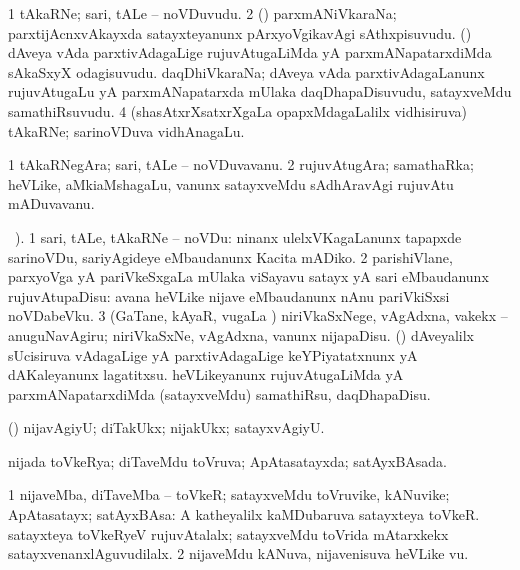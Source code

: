 \bentry
{} 
\gl{\nA}
\expl{}
\bmng
\bnum
\num{1} tAkaRNe; sari, tALe -- noVDuvudu. 
\num{2} (\tashA) parxmANiVkaraNa; parxtijAcnxvAkayxda satayxteyanunx pArxyoVgikavAgi sAthxpisuvudu. 
\banum
{} (\nAyxshA) dAveya vAda parxtivAdagaLige rujuvAtugaLiMda yA parxmANapatarxdiMda sAkaSxyX odagisuvudu. 
 daqDhiVkaraNa; dAveya vAda parxtivAdagaLanunx rujuvAtugaLu yA parxmANapatarxda mUlaka daqDhapaDisuvudu, satayxveMdu samathiRsuvudu. 
\eanum
\numie
\num{4} (shasAtxrXsatxrXgaLa opapxMdagaLalilx vidhisiruva) tAkaRNe; sarinoVDuva vidhAnagaLu. 
\enum
\emng
\eentry

\bentry
{} 
\gl{\nA}
\expl{}
\bmng
\bnum
\num{1} tAkaRNegAra; sari, tALe -- noVDuvavanu. 
\num{2} rujuvAtugAra; samathaRka; heVLike, aMkiaMshagaLu, \mo vanunx satayxveMdu sAdhAravAgi rujuvAtu mADuvavanu. 
\enum
\emng
\eentry

\bentry
{} 
\gl{\sakirx}
\BUkaq\ ). \bmng
\bnum
\num{1} sari, tALe, tAkaRNe -- noVDu:  ninanx ulelxVKagaLanunx tapapxde sarinoVDu, sariyAgideye eMbaudanunx Kacita mADiko. 
\num{2} parishiVlane, parxyoVga yA pariVkeSxgaLa mUlaka viSayavu satayx yA sari eMbaudanunx rujuvAtupaDisu:  avana heVLike nijave eMbaudanunx nAnu pariVkiSxsi noVDabeVku. 
\num{3} (GaTane, kAyaR, \mo vugaLa \vi) niriVkaSxNege, vAgAdxna, \mo vakekx -- anuguNavAgiru; niriVkaSxNe, vAgAdxna, \mo vanunx nijapaDisu. 
 (\nAyxshA) 
\banum
{} dAveyalilx sUcisiruva vAdagaLige yA parxtivAdagaLige keYPiyatatxnunx yA dAKaleyanunx lagatitxsu. 
 heVLikeyanunx rujuvAtugaLiMda yA parxmANapatarxdiMda (satayxveMdu) samathiRsu, daqDhapaDisu. 
\eanum
\numie
\enum
\emng
\eentry

\bentry
{} 
\gl{\kirxvi}
\expl{}
\bmng
 (\pArxparx) nijavAgiyU; diTakUkx; nijakUkx; satayxvAgiyU. 
\emng
\eentry

\bentry
{} 
\gl{\gu}
\expl{}
\bmng
 nijada toVkeRya; diTaveMdu toVruva; ApAtasatayxda; satAyxBAsada. 
\emng
\eentry

\bentry
{} 
\gl{\nA}
\expl{}
\bmng
\bnum
\num{1} nijaveMba, diTaveMba -- toVkeR; satayxveMdu toVruvike, kANuvike; ApAtasatayx; satAyxBAsa:  A katheyalilx kaMDubaruva satayxteya toVkeR.  satayxteya toVkeRyeV rujuvAtalalx; satayxveMdu toVrida mAtarxkekx satayxvenanxlAguvudilalx. 
\num{2} nijaveMdu kANuva, nijavenisuva heVLike \mo vu. 
\enum
\emng
\eentry

